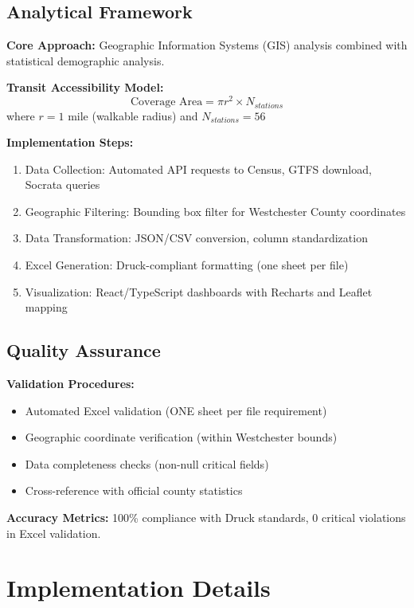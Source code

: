\documentclass[11pt,letterpaper]{article}
\begin{document}
\subsection{Analytical Framework}

\textbf{Core Approach:} Geographic Information Systems (GIS) analysis combined with statistical demographic analysis.

\textbf{Transit Accessibility Model:}
\begin{equation}
    \text{Coverage Area} = \pi r^2 \times N_{stations}
\end{equation}
where $r = 1$ mile (walkable radius) and $N_{stations} = 56$

\textbf{Implementation Steps:}
\begin{enumerate}
    \item Data Collection: Automated API requests to Census, GTFS download, Socrata queries
    \item Geographic Filtering: Bounding box filter for Westchester County coordinates
    \item Data Transformation: JSON/CSV conversion, column standardization
    \item Excel Generation: Druck-compliant formatting (one sheet per file)
    \item Visualization: React/TypeScript dashboards with Recharts and Leaflet mapping
\end{enumerate}

\subsection{Quality Assurance}

\textbf{Validation Procedures:}
\begin{itemize}
    \item Automated Excel validation (ONE sheet per file requirement)
    \item Geographic coordinate verification (within Westchester bounds)
    \item Data completeness checks (non-null critical fields)
    \item Cross-reference with official county statistics
\end{itemize}

\textbf{Accuracy Metrics:} 100\% compliance with Druck standards, 0 critical violations in Excel validation.

\section{Implementation Details}
\end{document}
